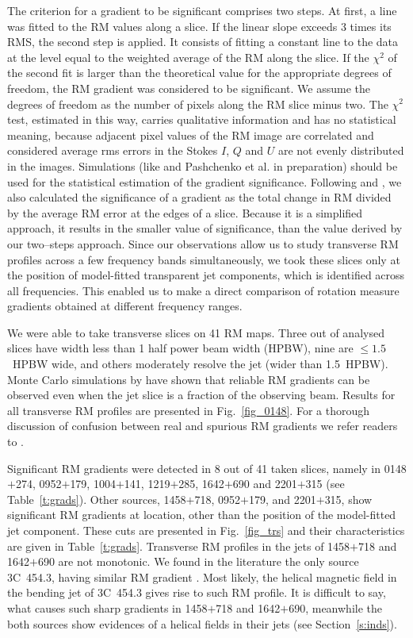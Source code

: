 \documentclass[a4paper,fleqn,usenatbib,useAMS]{mnras}
\begin{document}
The criterion for a gradient to be significant comprises two steps. 
At first, a line was fitted to the RM values along a slice. 
If the linear slope exceeds 3 times its RMS, the second step is applied. 
It consists of fitting a constant line to the data at the level equal to the weighted average of the RM along the slice. 
If the $\chi^2$ of the second fit is larger than the theoretical value for the appropriate degrees of freedom, the RM gradient was considered to be significant.
We assume the degrees of freedom as the number of pixels along the RM slice minus two. 
The $\chi^2$ test, estimated in this way, carries qualitative information and has no statistical meaning, because adjacent pixel values of the RM image are correlated and considered average rms errors in the Stokes $I$, $Q$ and $U$ are not evenly distributed in the images.
Simulations  (like \citealt{hovatta_etal12} and Pashchenko et al. in preparation) should be used for the statistical estimation of the gradient significance.
Following \citet{broderick_mckinney_10} and \citet{taylor_zavala_10}, we also calculated the significance of a gradient as the total change in RM divided by the average RM error at the edges of a slice.
Because it is a simplified approach, it results in the smaller value of significance, than the value derived by our two--steps approach.
Since our observations allow us to study transverse RM profiles across a few frequency bands simultaneously, we took these slices only at the position of model-fitted transparent jet components, which is identified across all frequencies. 
This enabled us to make a direct comparison of rotation measure gradients obtained at different frequency ranges.

We were able to take transverse slices on 41 RM maps.
Three out of analysed slices have width less than 1 half power beam width (HPBW), nine are $\leq1.5$~HPBW wide, and others moderately resolve the jet (wider than 1.5~HPBW). 
Monte Carlo simulations by \citet{mahmud_etal13} have shown that reliable RM gradients can be observed even when the jet slice is a fraction of  the observing beam. 
Results for all transverse RM profiles are presented in Fig.~\ref{fig_0148}.
For a thorough discussion of confusion between real and spurious RM gradients we refer readers to \citet{taylor_zavala_10,hovatta_etal12,algaba13}.

Significant RM gradients were detected in 8 out of 41 taken slices, namely in 0148$+$274, 0952$+$179, 1004$+$141, 1219$+$285, 1642$+$690 and 2201$+$315 (see Table~\ref{t:grads}). 
Other sources, 1458$+$718, 0952$+$179, and 2201$+$315, show significant RM gradients at location, other than the position of the model-fitted jet component. 
These cuts are presented in Fig.~\ref{fig_trs} and their characteristics are given in Table~\ref{t:grads}.
Transverse RM profiles in the jets of 1458$+$718 and 1642$+$690 are not monotonic. We found in the literature the only source 3C~454.3, having similar RM gradient \citep{hovatta_etal12,zamaninasab_etal13}. Most likely, the helical magnetic field in the bending jet of 3C~454.3 gives rise to such RM profile. It is difficult to say, what causes such sharp gradients in 1458$+$718 and 1642$+$690, meanwhile the both sources show evidences of a helical fields in their jets (see Section~\ref{s:inds}).
\end{document}
